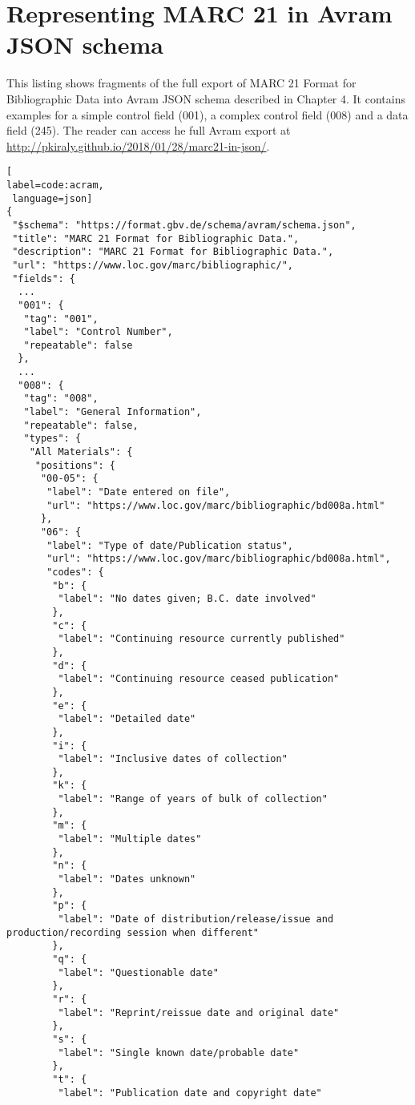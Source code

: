 \chapter{Representing MARC 21 in Avram JSON schema}

This listing shows fragments of the full export of MARC 21 Format for Bibliographic Data into Avram JSON schema described in Chapter 4. It contains examples for a simple control field (001), a complex control field (008) and a data field (245). The reader can access he full Avram export at \url{http://pkiraly.github.io/2018/01/28/marc21-in-json/}.

\begin{scriptsize}
\begin{lstlisting}[
label=code:acram,
 language=json]
{
 "$schema": "https://format.gbv.de/schema/avram/schema.json",
 "title": "MARC 21 Format for Bibliographic Data.",
 "description": "MARC 21 Format for Bibliographic Data.",
 "url": "https://www.loc.gov/marc/bibliographic/",
 "fields": {
  ...
  "001": {
   "tag": "001",
   "label": "Control Number",
   "repeatable": false
  },
  ...
  "008": {
   "tag": "008",
   "label": "General Information",
   "repeatable": false,
   "types": {
    "All Materials": {
     "positions": {
      "00-05": {
       "label": "Date entered on file",
       "url": "https://www.loc.gov/marc/bibliographic/bd008a.html"
      },
      "06": {
       "label": "Type of date/Publication status",
       "url": "https://www.loc.gov/marc/bibliographic/bd008a.html",
       "codes": {
        "b": {
         "label": "No dates given; B.C. date involved"
        },
        "c": {
         "label": "Continuing resource currently published"
        },
        "d": {
         "label": "Continuing resource ceased publication"
        },
        "e": {
         "label": "Detailed date"
        },
        "i": {
         "label": "Inclusive dates of collection"
        },
        "k": {
         "label": "Range of years of bulk of collection"
        },
        "m": {
         "label": "Multiple dates"
        },
        "n": {
         "label": "Dates unknown"
        },
        "p": {
         "label": "Date of distribution/release/issue and production/recording session when different"
        },
        "q": {
         "label": "Questionable date"
        },
        "r": {
         "label": "Reprint/reissue date and original date"
        },
        "s": {
         "label": "Single known date/probable date"
        },
        "t": {
         "label": "Publication date and copyright date"

\end{lstlisting}
\end{scriptsize}
